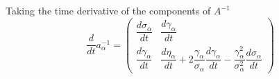 Taking the time derivative of the components of $A^{-1}$
\begin{equation} \label{eq:dainvdt}
  \frac{d}{dt} a^{-1}_{\alpha} = 
  \begin{pmatrix}
    \dfrac{d\sigma_{\alpha}}{dt} & \dfrac{d\gamma_{\alpha}}{dt} \\
    \dfrac{d\gamma_{\alpha}}{dt} & \dfrac{d\eta_{\alpha}}{dt} + 2\dfrac{\gamma_{\alpha}}{\sigma_{\alpha}}\dfrac{d\gamma_{\alpha}}{dt}- \dfrac{\gamma^{2}_{\alpha}}{\sigma^{2}_{\alpha}}\dfrac{d\sigma_{\alpha}}{dt}
  \end{pmatrix}
\end{equation}
